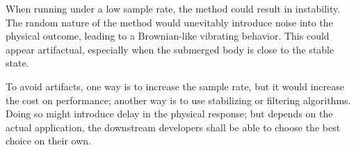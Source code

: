 When running under a low sample rate, the method could result in instability.
The random nature of the method would unevitably introduce noise into the physical outcome, leading to a Brownian-like vibrating behavior.
This could appear artifactual, especially when the submerged body is close to the stable state.

To avoid artifacts, one way is to increase the sample rate, but it would increase the cost on performance;
another way is to use stabilizing or filtering algorithms.
Doing so might introduce delay in the physical response;
but depends on the actual application, the downstream developers shall be able to choose the best choice on their own.

\begin{comment}
\section*{Postscripts and Acknowledgements}

This is the first time I have ever written a serious academical article.
It is guaranteed that there will be naive mistakes all over the place.
Please excuse me, thou reader.
If thou hast spotted any mistake, please feel free to contact me at \url{wangnianyi2001@outlook.com}.
My apologies in advance!

Thanks to the team of my graduation project, \emph{Nani Core} (\url{https://github.com/nani-core}).
The idea of this article rose when I was making the water system in the project.
They established the possibilty for this article to happen.
Special thanks to 陈恩晖 (Omnisch) and 张嘉玥 (Limko).
They are two really, really reliable co-workers and good friends of mine.
They have given me the greatest mental and physical support on the project, and an unforgetful memory in my graduation year.
\end{comment}

\begin{comment}
	\section*{Appendix}

	A sample project of the simulation experiment is published at \url{https://github.com/WangNianyi2001/Water-Simulation-2024}.
\end{comment}